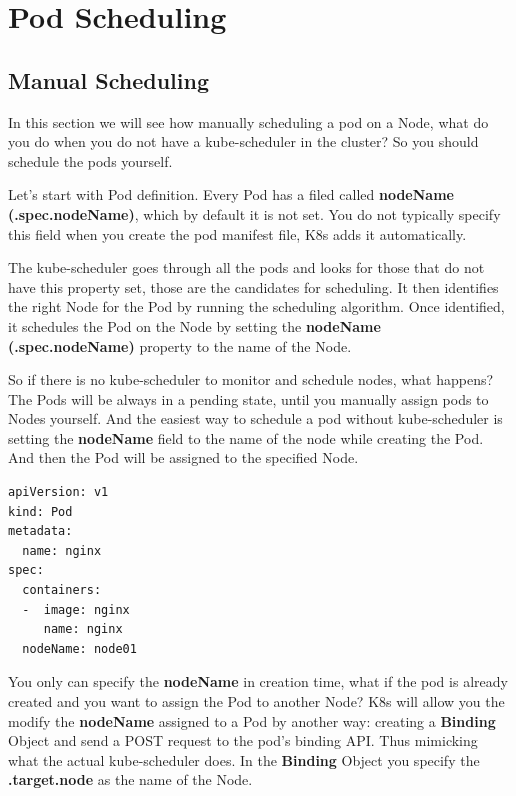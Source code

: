 \documentclass{article}
\newenvironment{codetemplate}[1][]{%
  \mybasecolorbox[#1]
  \itshape
}{%
  \endmybasecolorbox
}
\begin{document}
\newpage
\section{Pod Scheduling}

\subsection{Manual Scheduling}

In this section we will see how manually scheduling a pod on a Node, what do you do when you do not have a kube-scheduler in the cluster? So you should schedule the pods yourself.

Let's start with Pod definition. Every Pod has a filed called \textbf{nodeName (.spec.nodeName)}, which by default it is not set. You do not typically specify this field when you create the pod manifest file, K8s adds it automatically. 

The kube-scheduler goes through all the pods and looks for those that do not have this property set, those are the candidates for scheduling. It then identifies the right Node for the Pod by running the scheduling algorithm. Once identified, it schedules the Pod on the Node by setting the \textbf{nodeName (.spec.nodeName)} property to the name of the Node. 

So if there is no kube-scheduler to monitor and schedule nodes, what happens? The Pods will be always in a pending state, until you manually assign pods to Nodes yourself. And the easiest way to schedule a pod without kube-scheduler is setting the \textbf{nodeName} field to the name of the node while creating the Pod. And then the Pod will be assigned to the specified Node. 

\begin{codetemplate}{}
\begin{verbatim}
apiVersion: v1
kind: Pod
metadata:
  name: nginx
spec:
  containers:
  -  image: nginx
     name: nginx
  nodeName: node01
\end{verbatim}
\end{codetemplate}

You only can specify the \textbf{nodeName} in creation time, what if the pod is already created and you want to assign the Pod to another Node? K8s will allow you the modify the \textbf{nodeName} assigned to a Pod by another way: creating a \textbf{Binding} Object and send a POST request to the pod's binding API. Thus mimicking what the actual kube-scheduler does. In the \textbf{Binding} Object you specify the \textbf{.target.node} as the name of the Node.
\end{document}
